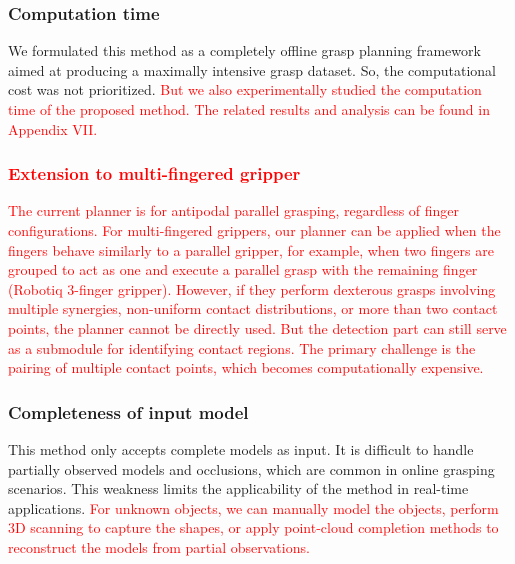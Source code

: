 \documentclass[journal]{IEEEtran}
\newcommand{\rev}[1]{\textcolor{red}{#1}}
\begin{document}
\subsubsection{Computation time}
We formulated this method as a completely offline grasp planning framework aimed at producing a maximally intensive grasp dataset. So, the computational cost was not prioritized. \rev{But we also experimentally studied the computation time of the proposed method. The related results and analysis can be found in Appendix VII.}

\subsubsection{\rev{Extension to multi-fingered gripper}}
\rev{The current planner is for antipodal parallel grasping, regardless of finger configurations. For multi-fingered grippers, our planner can be applied when the fingers behave similarly to a parallel gripper, for example, when two fingers are grouped to act as one and execute a parallel grasp with the remaining finger (Robotiq 3-finger gripper). However, if they perform dexterous grasps involving multiple synergies, non-uniform contact distributions, or more than two contact points, the planner cannot be directly used. But the detection part can still serve as a submodule for identifying contact regions. The primary challenge is the pairing of multiple contact points, which becomes computationally expensive.}

\subsubsection{Completeness of input model}
This method only accepts complete models as input. It is difficult to handle partially observed models and occlusions, which are common in online grasping scenarios. This weakness limits the applicability of the method in real-time applications. 
\rev{For unknown objects, we can manually model the objects, perform 3D scanning to capture the shapes, or apply point-cloud completion methods to reconstruct the models from partial observations.}
\end{document}

